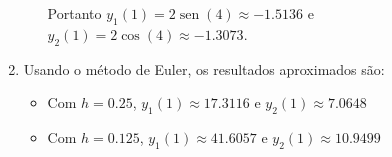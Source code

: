 \documentclass[12pt,a4paper]{article}
\newcommand*\sen{\operatorname{sen}}
\begin{document}
\begin{enumerate}
\begin{enumerate}
Portanto $y_1(1) = 2\sen(4) \approx -1.5136$ e $y_2(1) = 2\cos(4) \approx -1.3073$.

\end{enumerate}
\item Usando o método de Euler, os resultados aproximados são:
\begin{itemize}
\item Com $h=0.25$, $y_1(1) \approx 17.3116$ e $y_2(1) \approx 7.0648$
\item Com $h=0.125$, $y_1(1) \approx 41.6057$ e $y_2(1) \approx 10.9499$
\end{itemize}

\end{enumerate}
\end{document}

